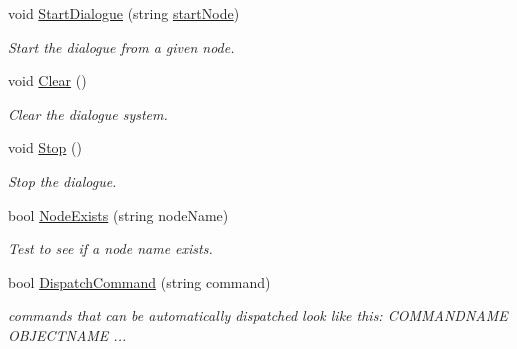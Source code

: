 \begin{DoxyCompactItemize}
void \hyperlink{a00093_abda765c6804853e264282a0f45920cd3}{Start\-Dialogue} (string \hyperlink{a00093_a61c92b8d2228d01d8ac123b73bbb41a0}{start\-Node})
\begin{DoxyCompactList}\small\item\em Start the dialogue from a given node. \end{DoxyCompactList}\item 
void \hyperlink{a00093_a09f5769c0c0921a21e659fed0af09c01}{Clear} ()
\begin{DoxyCompactList}\small\item\em Clear the dialogue system. \end{DoxyCompactList}\item 
void \hyperlink{a00093_af94e66876098f8b187181014973645e6}{Stop} ()
\begin{DoxyCompactList}\small\item\em Stop the dialogue. \end{DoxyCompactList}\item 
bool \hyperlink{a00093_aadf7711b9ba101d6ce8ba491d9c5a4c3}{Node\-Exists} (string node\-Name)
\begin{DoxyCompactList}\small\item\em Test to see if a node name exists. \end{DoxyCompactList}\item 
bool \hyperlink{a00093_a7b200f8ddcf77f50906a6341aadeb671}{Dispatch\-Command} (string command)
\begin{DoxyCompactList}\small\item\em commands that can be automatically dispatched look like this\-: C\-O\-M\-M\-A\-N\-D\-N\-A\-M\-E O\-B\-J\-E\-C\-T\-N\-A\-M\-E    ... \end{DoxyCompactList}\end{DoxyCompactItemize}
